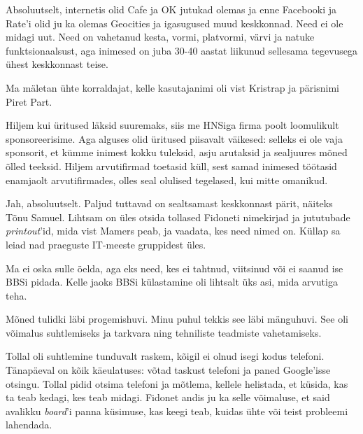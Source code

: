 Absoluutselt, internetis olid Cafe ja OK jutukad olemas ja enne 
Facebooki ja Rate'i olid ju ka olemas Geocities ja igasugused muud keskkonnad. Need ei ole midagi uut. Need on vahetanud kesta, vormi, 
platvormi, värvi ja natuke funktsionaalsust, aga inimesed on juba 30-40 
aastat liikunud sellesama tegevusega ühest keskkonnast teise.


Ma mäletan ühte korraldajat, kelle kasutajanimi oli vist Kristrap ja pärisnimi Piret 
Part.


Hiljem kui üritused läksid suuremaks, siis me HNSiga firma poolt loomulikult 
sponsoreerisime. Aga alguses olid üritused piisavalt väikesed: selleks ei ole vaja sponsorit, et kümme
inimest kokku tuleksid, asju arutaksid ja sealjuures mõned 
õlled teeksid. Hiljem arvutifirmad toetasid küll, sest samad inimesed 
töötasid enamjaolt arvutifirmades, olles seal olulised tegelased, kui mitte 
omanikud.


Jah, absoluutselt. Paljud tuttavad on sealtsamast keskkonnast pärit, näiteks Tõnu 
Samuel. Lihtsam on üles otsida tollased Fidoneti nimekirjad ja jututubade 
\emph{printout}'id, mida vist Mamers peab, ja vaadata, 
kes need nimed on. Küllap sa leiad nad praeguste 
IT-meeste gruppidest üles.


Ma ei oska sulle öelda, aga eks need, kes ei 
tahtnud, viitsinud või ei saanud ise BBSi pidada. Kelle jaoks BBSi külastamine oli 
lihtsalt üks asi, mida arvutiga teha.


Mõned tulidki läbi progemishuvi. Minu puhul tekkis see läbi mänguhuvi. See oli võimalus suhtlemiseks ja tarkvara ning tehniliste teadmiste vahetamiseks.

Tollal oli suhtlemine tunduvalt raskem, kõigil ei olnud 
isegi kodus telefoni. Tänapäeval on kõik käeulatuses: võtad
taskust telefoni ja paned Google'isse otsingu. Tollal 
pidid otsima telefoni ja mõtlema, kellele helistada, et küsida, kas ta teab 
kedagi, kes teab midagi. Fidonet andis ju ka selle võimaluse, et said 
avalikku \emph{board}'i panna küsimuse, kas keegi teab, kuidas 
ühte või teist probleemi lahendada.

